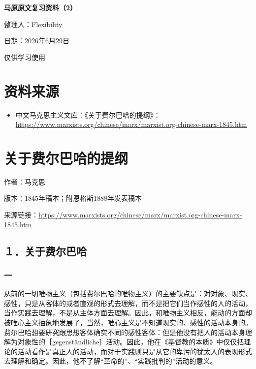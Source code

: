 \documentclass[UTF8,zihao=-4,a4paper]{ctexart}
\begin{document}
\begin{titlepage}
\thispagestyle{empty}
\centering
\vspace*{0.22\textheight}
{\bfseries 马原原文复习资料（2）\par}
\vspace{3.5cm}
{ 整理人：Flexibility\par}
\vspace{1.2cm}
{ 日期：2026年6月29日\par}
\vfill
{ 仅供学习使用\par}
\end{titlepage}
\setcounter{page}{1}
\tableofcontents
\newpage
\section*{资料来源}
\begin{itemize}
\item 中文马克思主义文库：《关于费尔巴哈的提纲》：\url{https://www.marxists.org/chinese/marx/marxist.org-chinese-marx-1845.htm}
\end{itemize}
\newpage
\section*{关于费尔巴哈的提纲}
作者：马克思\par
版本：1845年稿本；附恩格斯1888年发表稿本\par
来源链接：\url{https://www.marxists.org/chinese/marx/marxist.org-chinese-marx-1845.htm}\par
\subsection*{１．关于费尔巴哈}
\subsubsection*{一}
从前的一切唯物主义（包括费尔巴哈的唯物主义）的主要缺点是：对对象、现实、感性，只是从客体的或者直观的形式去理解，而不是把它们当作感性的人的活动，当作实践去理解，不是从主体方面去理解。因此，和唯物主义相反，能动的方面却被唯心主义抽象地发展了，当然，唯心主义是不知道现实的、感性的活动本身的。费尔巴哈想要研究跟思想客体确实不同的感性客体：但是他没有把人的活动本身理解为对象性的［gegenständliche］活动。因此，他在《基督教的本质》中仅仅把理论的活动看作是真正人的活动，而对于实践则只是从它的卑污的犹太人的表现形式去理解和确定。因此，他不了解“革命的”、“实践批判的”活动的意义。\par
\end{document}

